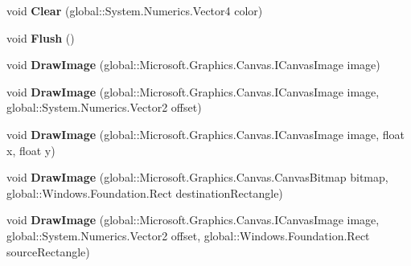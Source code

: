 \begin{DoxyCompactItemize}
void {\bfseries Clear} (global\+::\+System.\+Numerics.\+Vector4 color)
\item 
\mbox{\label{class_microsoft_1_1_graphics_1_1_canvas_1_1_canvas_drawing_session_aa73abd2814515b3c01931aee8baf7995}} 
void {\bfseries Flush} ()
\item 
\mbox{\label{class_microsoft_1_1_graphics_1_1_canvas_1_1_canvas_drawing_session_acc7aeb2a0829a9f83508ee320cb32e17}} 
void {\bfseries Draw\+Image} (global\+::\+Microsoft.\+Graphics.\+Canvas.\+I\+Canvas\+Image image)
\item 
\mbox{\label{class_microsoft_1_1_graphics_1_1_canvas_1_1_canvas_drawing_session_a5ea40c57c8feef90c31ff91d3e136b95}} 
void {\bfseries Draw\+Image} (global\+::\+Microsoft.\+Graphics.\+Canvas.\+I\+Canvas\+Image image, global\+::\+System.\+Numerics.\+Vector2 offset)
\item 
\mbox{\label{class_microsoft_1_1_graphics_1_1_canvas_1_1_canvas_drawing_session_a8823e29fc6dd5003f7638c113c7cc318}} 
void {\bfseries Draw\+Image} (global\+::\+Microsoft.\+Graphics.\+Canvas.\+I\+Canvas\+Image image, float x, float y)
\item 
\mbox{\label{class_microsoft_1_1_graphics_1_1_canvas_1_1_canvas_drawing_session_a541568321b8b658d00742ae7ad99cac9}} 
void {\bfseries Draw\+Image} (global\+::\+Microsoft.\+Graphics.\+Canvas.\+Canvas\+Bitmap bitmap, global\+::\+Windows.\+Foundation.\+Rect destination\+Rectangle)
\item 
\mbox{\label{class_microsoft_1_1_graphics_1_1_canvas_1_1_canvas_drawing_session_a6310e61010770fe5778d67e339d796f0}} 
void {\bfseries Draw\+Image} (global\+::\+Microsoft.\+Graphics.\+Canvas.\+I\+Canvas\+Image image, global\+::\+System.\+Numerics.\+Vector2 offset, global\+::\+Windows.\+Foundation.\+Rect source\+Rectangle)
\item 
\mbox{\label{class_microsoft_1_1_graphics_1_1_canvas_1_1_canvas_drawing_session_a772f53102b4ecaf7f4709b7cf9d0be27}} 

\end{DoxyCompactItemize}
